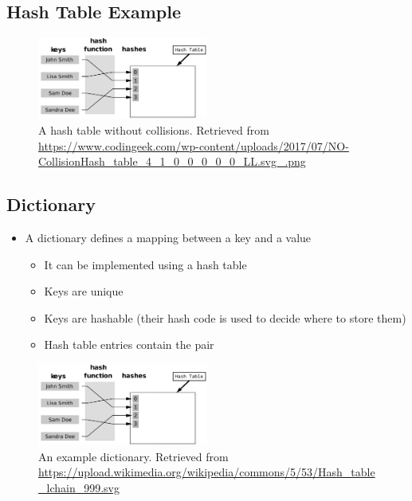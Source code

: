 \documentclass[
  10pt,
  english,
  letterpaper,
,tablecaptionabove
]{scrartcl}
\providecommand{\tightlist}{%
  \setlength{\itemsep}{0pt}\setlength{\parskip}{0pt}}
\begin{document}
\hypertarget{hash-table-example}{%
\subsection{Hash Table Example}\label{hash-table-example}}

\begin{figure}
\centering
\includegraphics[width=0.5\textwidth,height=\textheight]{images/6.png}
\caption{A hash table without collisions. Retrieved from
\url{https://www.codingeek.com/wp-content/uploads/2017/07/NO-CollisionHash_table_4_1_0_0_0_0_0_LL.svg_.png}}
\end{figure}

\hypertarget{dictionary}{%
\subsection{Dictionary}\label{dictionary}}

\begin{itemize}
\tightlist
\item
  A dictionary defines a mapping between a key and a value

  \begin{itemize}
  \tightlist
  \item
    It can be implemented using a hash table
  \item
    Keys are unique
  \item
    Keys are hashable (their hash code is used to decide where to store
    them)
  \item
    Hash table entries contain the pair
  \end{itemize}
\end{itemize}

\begin{figure}
\centering
\includegraphics[width=0.5\textwidth,height=\textheight]{images/6.png}
\caption{An example dictionary. Retrieved from
\url{https://upload.wikimedia.org/wikipedia/commons/5/53/Hash_table_lchain_999.svg}}
\end{figure}
\end{document}
